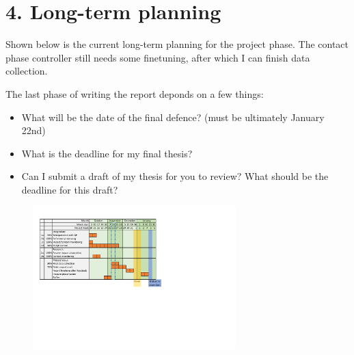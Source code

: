 \documentclass[11pt]{report}
\numberwithin{equation}{section}        %
\numberwithin{figure}{section}          %
\numberwithin{table}{section}           %
\begin{document}
  \section*{4. Long-term planning}
  Shown below is the current long-term planning for the project phase.  The contact phase controller still needs some finetuning, after which I can finish data collection.

  The last phase of writing the report deponds on a few things:
  \begin{itemize}
    \item What will be the date of the final defence? (must be ultimately January 22nd)
    \item What is the deadline for my final thesis?
    \item Can I submit a draft of my thesis for you to review? What should be the deadline for this draft?
  \end{itemize}
  \begin{figure}[H]
  \centering
  \includegraphics[width=0.7\textwidth, trim={0.87cm 8.5cm 10cm 1.5cm},clip]{Graphics/planning v2.pdf}

  \label{fig:my_label}
  \end{figure}
\end{document}
